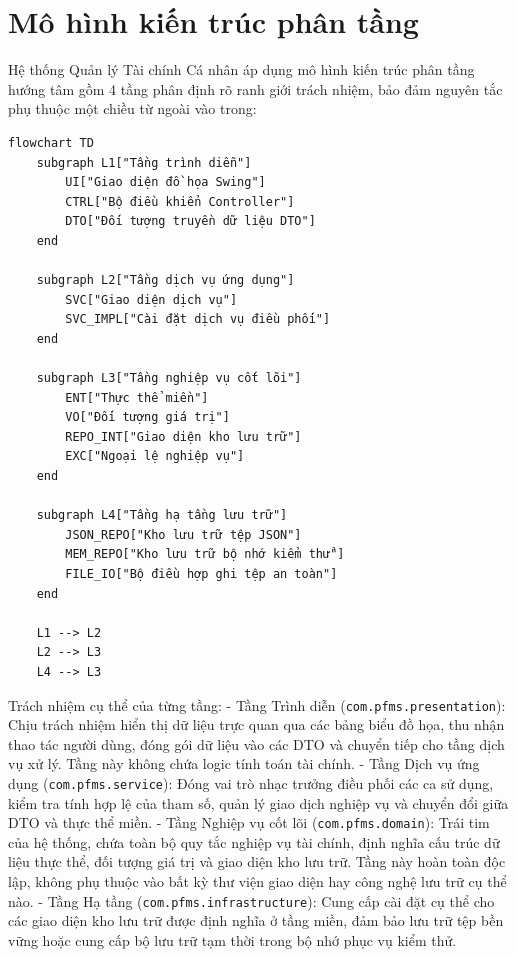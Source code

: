 \documentclass[a4paper,12pt]{report}
\newcommand{\passthrough}[1]{#1}
\begin{document}
\section{Mô hình kiến trúc phân
tầng}\label{muxf4-huxecnh-kiux1ebfn-truxfac-phuxe2n-tux1ea7ng}

Hệ thống Quản lý Tài chính Cá nhân áp dụng mô hình kiến trúc phân tầng
hướng tâm gồm 4 tầng phân định rõ ranh giới trách nhiệm, bảo đảm nguyên
tắc phụ thuộc một chiều từ ngoài vào trong:

\begin{lstlisting}
flowchart TD
    subgraph L1["Tầng trình diễn"]
        UI["Giao diện đồ họa Swing"]
        CTRL["Bộ điều khiển Controller"]
        DTO["Đối tượng truyền dữ liệu DTO"]
    end

    subgraph L2["Tầng dịch vụ ứng dụng"]
        SVC["Giao diện dịch vụ"]
        SVC_IMPL["Cài đặt dịch vụ điều phối"]
    end

    subgraph L3["Tầng nghiệp vụ cốt lõi"]
        ENT["Thực thể miền"]
        VO["Đối tượng giá trị"]
        REPO_INT["Giao diện kho lưu trữ"]
        EXC["Ngoại lệ nghiệp vụ"]
    end

    subgraph L4["Tầng hạ tầng lưu trữ"]
        JSON_REPO["Kho lưu trữ tệp JSON"]
        MEM_REPO["Kho lưu trữ bộ nhớ kiểm thử"]
        FILE_IO["Bộ điều hợp ghi tệp an toàn"]
    end

    L1 --> L2
    L2 --> L3
    L4 --> L3
\end{lstlisting}

Trách nhiệm cụ thể của từng tầng: - Tầng Trình diễn
(\passthrough{\lstinline!com.pfms.presentation!}): Chịu trách nhiệm hiển
thị dữ liệu trực quan qua các bảng biểu đồ họa, thu nhận thao tác người
dùng, đóng gói dữ liệu vào các DTO và chuyển tiếp cho tầng dịch vụ xử
lý. Tầng này không chứa logic tính toán tài chính. - Tầng Dịch vụ ứng
dụng (\passthrough{\lstinline!com.pfms.service!}): Đóng vai trò nhạc
trưởng điều phối các ca sử dụng, kiểm tra tính hợp lệ của tham số, quản
lý giao dịch nghiệp vụ và chuyển đổi giữa DTO và thực thể miền. - Tầng
Nghiệp vụ cốt lõi (\passthrough{\lstinline!com.pfms.domain!}): Trái tim
của hệ thống, chứa toàn bộ quy tắc nghiệp vụ tài chính, định nghĩa cấu
trúc dữ liệu thực thể, đối tượng giá trị và giao diện kho lưu trữ. Tầng
này hoàn toàn độc lập, không phụ thuộc vào bất kỳ thư viện giao diện hay
công nghệ lưu trữ cụ thể nào. - Tầng Hạ tầng
(\passthrough{\lstinline!com.pfms.infrastructure!}): Cung cấp cài đặt cụ
thể cho các giao diện kho lưu trữ được định nghĩa ở tầng miền, đảm bảo
lưu trữ tệp bền vững hoặc cung cấp bộ lưu trữ tạm thời trong bộ nhớ phục
vụ kiểm thử.
\end{document}
